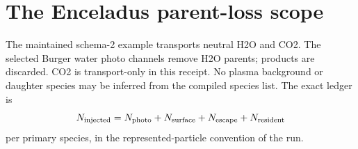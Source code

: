 \section{The Enceladus parent-loss scope}
The maintained schema-2 example transports neutral H2O and CO2. The selected
Burger water photo channels remove H2O parents; products are discarded.
CO2 is transport-only in this receipt. No plasma background or daughter
species may be inferred from the compiled species list. The exact ledger is
\begin{equation}
N_{\rm injected}=N_{\rm photo}+N_{\rm surface}
+N_{\rm escape}+N_{\rm resident}
\end{equation}
per primary species, in the represented-particle convention of the run.
